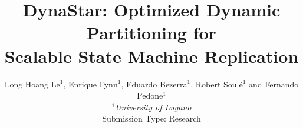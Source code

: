 \documentclass[10pt,twocolumn]{article}
\newcommand{\dynastar}{\mbox{DynaStar}\xspace}
\begin{document}
\title{\dynastar: Optimized Dynamic Partitioning for\\ Scalable State Machine Replication}
\author{Long Hoang Le$^1$, Enrique Fynn$^1$, Eduardo Bezerra$^1$, Robert Soul\'{e}$^1$ and Fernando Pedone$^1$ \\
\small {\em  $^1$University of Lugano} \\ [2mm]
\small Submission Type: Research
}
\date{}
\maketitle

\thispagestyle{empty}

\begin{abstract}
  
\end{abstract}










%



%




\end{document}
